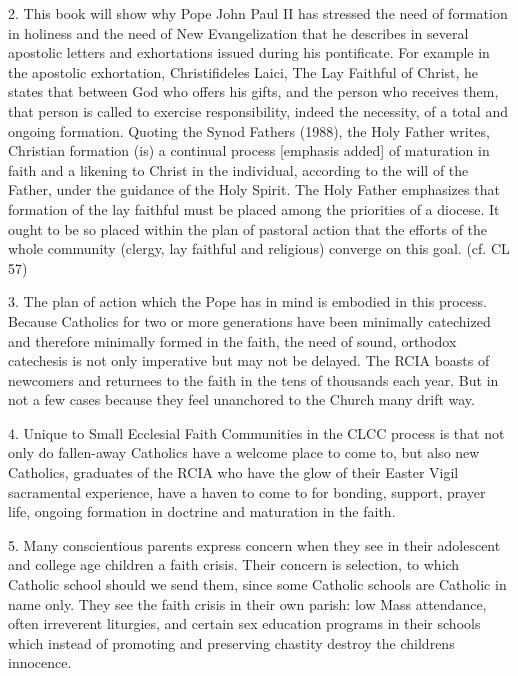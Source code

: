 \documentclass[oneside]{book}
\begin{document}
2. This book will show why Pope John Paul II has stressed the need of formation
in holiness and the need of New Evangelization that he describes in several
apostolic letters and exhortations issued during his pontificate. For example in
the apostolic exhortation, Christifideles Laici, The Lay Faithful of Christ, he
states that between God who offers his gifts, and the person who receives them,
that person is called to exercise responsibility, indeed the necessity, of a
total and ongoing formation. Quoting the Synod Fathers (1988), the Holy Father
writes, Christian formation (is) a continual process [emphasis added] of
maturation in faith and a likening to Christ in the individual, according to the
will of the Father, under the guidance of the Holy Spirit. The Holy Father
emphasizes that formation of the lay faithful must be placed among the
priorities of a diocese. It ought to be so placed within the plan of pastoral
action that the efforts of the whole community (clergy, lay faithful and
religious) converge on this goal. (cf. CL 57)

3. The plan of action which the Pope has in mind is embodied in this
process. Because Catholics for two or more generations have been minimally
catechized and therefore minimally formed in the faith, the need of sound,
orthodox catechesis is not only imperative but may not be delayed. The RCIA
boasts of newcomers and returnees to the faith in the tens of thousands each
year. But in not a few cases because they feel unanchored to the Church many
drift way.

4. Unique to Small Ecclesial Faith Communities in the CLCC process is that not
only do fallen-away Catholics have a welcome place to come to, but also new
Catholics, graduates of the RCIA who have the glow of their Easter Vigil
sacramental experience, have a haven to come to for bonding, support, prayer
life, ongoing formation in doctrine and maturation in the faith.

5. Many conscientious parents express concern when they see in their adolescent
and college age children a faith crisis. Their concern is selection, to which
Catholic school should we send them, since some Catholic schools are Catholic in
name only. They see the faith crisis in their own parish: low Mass attendance,
often irreverent liturgies, and certain sex education programs in their schools
which instead of promoting and preserving chastity destroy the childrens
innocence.
\end{document}
